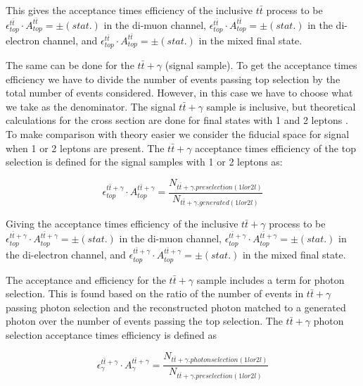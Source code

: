 This gives the acceptance times efficiency of the inclusive $t\bar{t}$ process to be $\epsilon^{t\bar{t}}_{top} \cdot A^{t\bar{t}}_{top} =   \pm  (stat.)$ in the di-muon channel, $\epsilon^{t\bar{t}}_{top} \cdot A^{t\bar{t}}_{top} =  \pm  (stat.)$ in the di-electron channel, and $\epsilon^{t\bar{t}}_{top} \cdot A^{t\bar{t}}_{top} =  \pm  (stat.)$ in the mixed final state.

The same can be done for the $t\bar{t}+\gamma$ (signal sample). To get the acceptance times efficiency we have to divide the number of events passing top selection by the total number of events considered. However, in this case we have to choose what we take as the denominator. The signal $t\bar{t}+\gamma$ sample is inclusive, but theoretical calculations for the cross section are done for final states with 1 and 2 leptons \cite{QCDCorrectionsttgamma2011}. To make comparison with theory easier we consider the fiducial space for signal when 1 or 2 leptons are present. The $t\bar{t}+\gamma$ acceptance times efficiency of the top selection is defined for the signal samples with 1 or 2 leptons as:

\begin{equation}
	\epsilon^{t\bar{t}+\gamma}_{top} \cdot A^{t\bar{t}+\gamma}_{top} = \frac{N_{t\bar{t}+\gamma.preselection(1lor2l)}}{N_{t\bar{t}+\gamma.generated(1lor2l)}} 
\end{equation}

Giving the acceptance times efficiency of the inclusive $t\bar{t}+\gamma$ process to be $\epsilon^{t\bar{t}+\gamma}_{top} \cdot A^{t\bar{t}+\gamma}_{top} =   \pm  (stat.)$ in the di-muon channel, $\epsilon^{t\bar{t}+\gamma}_{top} \cdot A^{t\bar{t}+\gamma}_{top} =  \pm  (stat.)$ in the di-electron channel, and $\epsilon^{t\bar{t}+\gamma}_{top} \cdot A^{t\bar{t}+\gamma}_{top} =  \pm  (stat.)$ in the mixed final state.

The acceptance and efficiency for the $t\bar{t}+\gamma$ sample includes a term for photon selection. This is found based on the ratio of the number of events in $t\bar{t}+\gamma$ passing photon selection and the reconstructed photon matched to a generated photon over the number of events passing the top selection. The $t\bar{t}+\gamma$ photon selection acceptance times efficiency is defined as

\begin{equation}
	\epsilon^{t\bar{t}+\gamma}_{\gamma} \cdot A^{t\bar{t}+\gamma}_{\gamma} = \frac{N_{t\bar{t}+\gamma.photonselection(1lor2l)}}{N_{t\bar{t}+\gamma.preselection(1lor2l)}} 
\end{equation}

